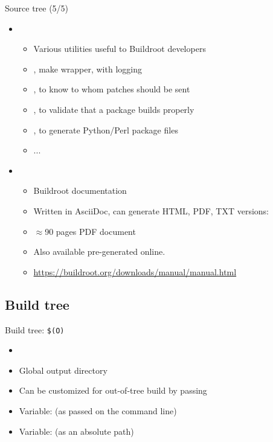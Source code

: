 \begin{frame}{Source tree (5/5)}
  \begin{itemize}
  \item {}
    \begin{itemize}
    \item Various utilities useful to Buildroot developers
    \item {}, make wrapper, with logging
    \item {}, to know to whom patches should be sent
    \item {}, to validate that a package builds properly
    \item {},  to generate Python/Perl
      package  files
    \item ...
    \end{itemize}
  \item {}
    \begin{itemize}
    \item Buildroot documentation
    \item Written in AsciiDoc, can generate HTML, PDF, TXT versions:
    \item $\approx$90 pages PDF document
    \item Also available pre-generated online.
    \item \url{https://buildroot.org/downloads/manual/manual.html}
    \end{itemize}
  \end{itemize}
\end{frame}

\subsection{Build tree}

\begin{frame}{Build tree: {\tt \$(O)}}
  \begin{itemize}
  \item {}
  \item Global output directory
  \item Can be customized for out-of-tree build by passing 
  \item Variable:  (as passed on the command line)
  \item Variable:  (as an absolute path)
  \end{itemize}
\end{frame}

